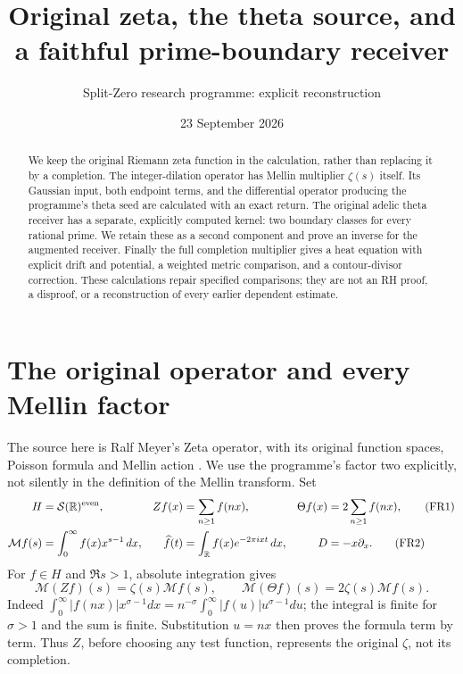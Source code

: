 \documentclass[11pt]{article}
\title{Original zeta, the theta source, and a faithful prime-boundary receiver}
\author{Split-Zero research programme: explicit reconstruction}
\date{23 September 2026}
\newcommand{\M}{\mathcal M}\newcommand{\Sch}{\mathcal S}
\begin{document}
\maketitle
\begin{abstract}
We keep the original Riemann zeta function in the calculation, rather than replacing it by a completion. The integer-dilation operator has Mellin multiplier $\zeta(s)$ itself. Its Gaussian input, both endpoint terms, and the differential operator producing the programme's theta seed are calculated with an exact return. The original adelic theta receiver has a separate, explicitly computed kernel: two boundary classes for every rational prime. We retain these as a second component and prove an inverse for the augmented receiver. Finally the full completion multiplier gives a heat equation with explicit drift and potential, a weighted metric comparison, and a contour-divisor correction. These calculations repair specified comparisons; they are not an RH proof, a disproof, or a reconstruction of every earlier dependent estimate.
\end{abstract}

\section{The original operator and every Mellin factor}
The source here is Ralf Meyer's Zeta operator, with its original function spaces, Poisson formula and Mellin action \cite{Meyer}. We use the programme's factor two explicitly, not silently in the definition of the Mellin transform. Set
\begin{align}
 H&=\Sch(\R)^{\rm even},&
 Zf(x)&=\sum_{n\geq1}f(nx),& \Theta f(x)&=2\sum_{n\geq1}f(nx),\tag{FR1}\\
 \M f(s)&=\int_0^\infty f(x)x^{s-1}\,dx,&
 \widehat f(t)&=\int_\R f(x)e^{-2\pi ixt}\,dx,&D&=-x\partial_x.\tag{FR2}
\end{align}
For $f\in H$ and $\Re s>1$, absolute integration gives
\begin{equation}
 \M(Zf)(s)=\zeta(s)\M f(s),\qquad
 \M(\Theta f)(s)=2\zeta(s)\M f(s).
 \tag{FR3}
\end{equation}
Indeed $\int_0^\infty|f(nx)|x^{\sigma-1}dx=n^{-\sigma}\int_0^\infty|f(u)|u^{\sigma-1}du$; the integral is finite for $\sigma>1$ and the sum is finite. Substitution $u=nx$ then proves the formula term by term. Thus $Z$, before choosing any test function, represents the original $\zeta$, not its completion.
\end{document}
